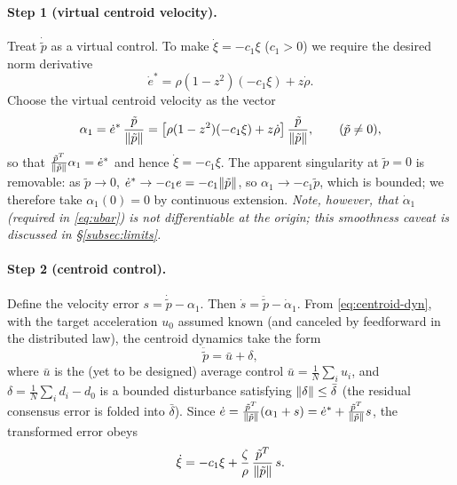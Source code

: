 \paragraph{Step 1 (virtual centroid velocity).}
Treat $\dot{\tilde p}$ as a virtual control. To make $\dot\xi=-c_1\xi$
($c_1>0$) we require the desired norm derivative
\[
\dot e^* = \rho(1-z^2)(-c_1\xi) + z\dot\rho.
\]
Choose the virtual centroid velocity as the vector
\begin{equation}
\alpha_1 = \dot e^*\,\frac{\tilde p}{\lVert \tilde p \rVert}
= \bigl[\rho(1-z^2)(-c_1\xi) + z\dot\rho\bigr]\,
  \frac{\tilde p}{\lVert \tilde p \rVert},
\qquad (\tilde p\neq 0),
\label{eq:alpha1}
\end{equation}
so that $\frac{\tilde p^T}{\lVert \tilde p \rVert}\alpha_1 = \dot e^*$ and hence
$\dot\xi=-c_1\xi$. The apparent singularity at $\tilde p=0$ is removable:
as $\tilde p\to0$, $\dot e^*\to -c_1 e = -c_1\lVert \tilde p \rVert$, so
$\alpha_1\to -c_1\tilde p$, which is bounded; we therefore take
$\alpha_1(0)=0$ by continuous extension. \emph{Note, however, that
$\dot\alpha_1$ (required in \eqref{eq:ubar}) is not differentiable at the
origin; this smoothness caveat is discussed in \S\ref{subsec:limits}.}

\paragraph{Step 2 (centroid control).}
Define the velocity error $s=\dot{\tilde p}-\alpha_1$. Then
$\dot s = \ddot{\tilde p} - \dot\alpha_1$. From
\eqref{eq:centroid-dyn}, with the target acceleration $u_0$ assumed known
(and canceled by feedforward in the distributed law), the centroid dynamics
take the form
\[
\ddot{\tilde p} = \bar u + \delta,
\]
where $\bar u$ is the (yet to be designed) average control
$\bar u=\frac1N\sum_i u_i$, and
$\delta = \frac1N\sum_i d_i - d_0$ is a bounded disturbance satisfying
$\lVert \delta \rVert\le\bar\delta$ (the residual consensus error is folded into
$\bar\delta$). Since
$\dot e = \frac{\tilde p^T}{\lVert \tilde p \rVert}(\alpha_1+s)
       = \dot e^* + \frac{\tilde p^T}{\lVert \tilde p \rVert}s$,
the transformed error obeys
\[
\dot\xi = -c_1\xi + \frac{\zeta}{\rho}\,
          \frac{\tilde p^T}{\lVert \tilde p \rVert}\,s.
\]

